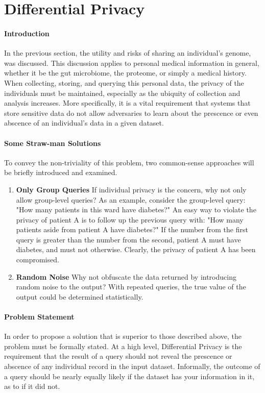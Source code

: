 \section{Differential Privacy}

\paragraph{Introduction}
In the previous section, the utility and risks of sharing an individual's genome, was discussed. This discussion applies to personal medical information in general, whether it be the gut microbiome, the proteome, or simply a medical history. When collecting, storing, and querying this personal data, the privacy of the individuals must be maintained, especially as the ubiquity of collection and analysis increases. More specifically, it is a vital requirement that systems that store sensitive data do not allow adversaries to learn about the prescence or even abscence of an individual's data in a given dataset.

\paragraph{Some Straw-man Solutions}
To convey the non-triviality of this problem, two common-sense approaches will be briefly introduced and examined.

\begin{enumerate}
\item \textbf{Only Group Queries} If individual privacy is the concern, why not only allow group-level queries? As an example, consider the group-level query: "How many patients in this ward have diabetes?" An easy way to violate the privacy of patient A is to follow up the previous query with: "How many patients aside from patient A have diabetes?" If the number from the first query is greater than the number from the second, patient A must have diabetes, and must not otherwise. Clearly, the privacy of patient A has been compromised.
\item \textbf{Random Noise} Why not obfuscate the data returned by introducing random noise to the output? With repeated queries, the true value of the output could be determined statistically.
\end{enumerate}

\paragraph{Problem Statement}
In order to propose a solution that is superior to those described above, the problem must be formally stated. At a high level, Differential Privacy is the requirement that the result of a query should not reveal the prescence or abscence of any individual record in the input dataset. Informally, the outcome of a query should be nearly equally likely if the dataset has your information in it, as to if it did not.

